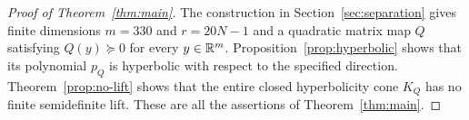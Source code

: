 \begin{proof}[Proof of Theorem~\ref{thm:main}]
The construction in Section~\ref{sec:separation} gives finite dimensions
$m=330$ and $r=20N-1$ and a quadratic matrix map $Q$ satisfying
$Q(y)\succeq0$ for every $y\in\mathbb R^m$.
Proposition~\ref{prop:hyperbolic} shows that its polynomial $p_Q$ is
hyperbolic with respect to the specified direction.
Theorem~\ref{prop:no-lift} shows that the entire closed hyperbolicity cone
$K_Q$ has no finite semidefinite lift.  These are all the assertions of
Theorem~\ref{thm:main}.
\end{proof}
